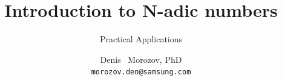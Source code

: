 %
%


{

}


\usepackage[english]{babel}



\usepackage{times}
\usepackage[T1]{fontenc}
\usepackage{graphicx} %
\usepackage{tikz}

\usepackage{verbatim}
\usetikzlibrary{arrows,shapes}


\title[Introduction to N-adic numbers] %
{Introduction to N-adic numbers}

\subtitle
{Practical Applications}


\author[Denis Morozov, PhD \ Samsung R\&D] %
{Denis~ Morozov, PhD  \\  \texttt{morozov.den@samsung.com}}


